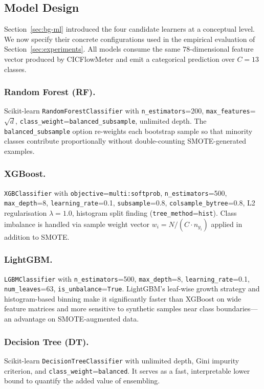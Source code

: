 \subsection{Model Design}
\label{sec:model-design}

Section~\ref{sec:bg-ml} introduced the four candidate learners at a conceptual level. We now specify their concrete configurations used in the empirical evaluation of Section~\ref{sec:experiments}. All models consume the same $78$-dimensional feature vector produced by CICFlowMeter and emit a categorical prediction over $C = 13$ classes.

\subsubsection*{Random Forest (RF).}
Scikit-learn \texttt{RandomForestClassifier} with \texttt{n\_estimators}=200, \texttt{max\_features}=$\sqrt{d}$, \texttt{class\_weight}=\texttt{balanced\_subsample}, unlimited depth. The \texttt{balanced\_subsample} option re-weights each bootstrap sample so that minority classes contribute proportionally without double-counting SMOTE-generated examples.

\subsubsection*{XGBoost.}
\texttt{XGBClassifier} with \texttt{objective}=\texttt{multi:softprob}, \texttt{n\_estimators}=500, \texttt{max\_depth}=8, \texttt{learning\_rate}=0.1, \texttt{subsample}=0.8, \texttt{colsample\_bytree}=0.8, L2 regularisation $\lambda=1.0$, histogram split finding (\texttt{tree\_method}=\texttt{hist}). Class imbalance is handled via sample weight vector $w_i = N / (C \cdot n_{y_i})$ applied in addition to SMOTE.

\subsubsection*{LightGBM.}
\texttt{LGBMClassifier} with \texttt{n\_estimators}=500, \texttt{max\_depth}=8, \texttt{learning\_rate}=0.1, \texttt{num\_leaves}=63, \texttt{is\_unbalance}=\texttt{True}. LightGBM's leaf-wise growth strategy and histogram-based binning make it significantly faster than XGBoost on wide feature matrices and more sensitive to synthetic samples near class boundaries---an advantage on SMOTE-augmented data.

\subsubsection*{Decision Tree (DT).}
Scikit-learn \texttt{DecisionTreeClassifier} with unlimited depth, Gini impurity criterion, and \texttt{class\_weight}=\texttt{balanced}. It serves as a fast, interpretable lower bound to quantify the added value of ensembling.

